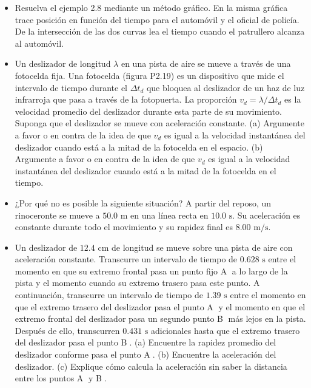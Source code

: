 \documentclass[11pt,a4paper]{article}
\begin{document}
\begin{itemize}
    \item[\textbf{18.}] Resuelva el ejemplo 2.8 mediante un método gráfico. En la misma gráfica trace posición en función del tiempo para el automóvil y el oficial de policía. De la intersección de las dos curvas lea el tiempo cuando el patrullero alcanza al automóvil.
    \vspace*{7cm}

    \item[\textbf{19.}] Un deslizador de longitud $\lambda$ en una pista de aire se mueve a través de una fotocelda fija. Una fotocelda (figura P2.19) es un dispositivo que mide el intervalo de tiempo durante el $\Delta t_d$ que bloquea al deslizador de un haz de luz infrarroja que pasa a través de la fotopuerta. La proporción $v_d = \lambda / \Delta t_d$ es la velocidad promedio del deslizador durante esta parte de su movimiento. Suponga que el deslizador se mueve con aceleración constante. (a) Argumente a favor o en contra de la idea de que $v_d$ es igual a la velocidad instantánea del deslizador cuando está a la mitad de la fotocelda en el espacio. (b) Argumente a favor o en contra de la idea de que $v_d$ es igual a la velocidad instantánea del deslizador cuando está a la mitad de la fotocelda en el tiempo.
    \vspace*{6cm}

    \item[\textbf{20.}] ¿Por qué no es posible la siguiente situación? A partir del reposo, un rinoceronte se mueve a $50.0 \text{ m}$ en una línea recta en $10.0 \text{ s}$. Su aceleración es constante durante todo el movimiento y su rapidez final es $8.00 \text{ m/s}$.
    \vspace*{5cm}

    \item[\textbf{21.}] Un deslizador de $12.4 \text{ cm}$ de longitud se mueve sobre una pista de aire con aceleración constante. Transcurre un intervalo de tiempo de $0.628 \text{ s}$ entre el momento en que su extremo frontal pasa un punto fijo \textcircled{A} a lo largo de la pista y el momento cuando su extremo trasero pasa este punto. A continuación, transcurre un intervalo de tiempo de $1.39 \text{ s}$ entre el momento en que el extremo trasero del deslizador pasa el punto \textcircled{A} y el momento en que el extremo frontal del deslizador pasa un segundo punto \textcircled{B} más lejos en la pista. Después de ello, transcurren $0.431 \text{ s}$ adicionales hasta que el extremo trasero del deslizador pasa el punto \textcircled{B}. (a) Encuentre la rapidez promedio del deslizador conforme pasa el punto \textcircled{A}. (b) Encuentre la aceleración del deslizador. (c) Explique cómo calcula la aceleración sin saber la distancia entre los puntos \textcircled{A} y \textcircled{B}.
    \vspace*{7cm}
\end{itemize}
\end{document}
